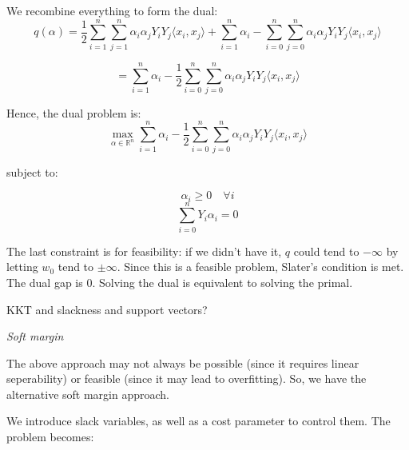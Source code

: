 \documentclass{minimal}
\begin{document}
We recombine everything to form the dual:
$$
q(\alpha) = \frac{1}{2} \sum_{i=1}^n \sum_{j=1}^n \alpha_i \alpha_j Y_i Y_j
\langle x_i, x_j \rangle + \sum_{i=1}^n \alpha_i - 
\sum_{i=0}^n \sum_{j=0}^n \alpha_i \alpha_j Y_i Y_j \langle x_i, x_j \rangle
$$

$$
= \sum_{i=1}^n \alpha_i - \frac{1}{2} \sum_{i=0}^n \sum_{j=0}^n \alpha_i \alpha_j Y_i Y_j \langle x_i, x_j \rangle
$$

Hence, the dual problem is:
$$
\max_{\alpha \in \mathbb{R}^n} 
\sum_{i=1}^n \alpha_i - \frac{1}{2} \sum_{i=0}^n \sum_{j=0}^n \alpha_i \alpha_j Y_i Y_j \langle x_i, x_j \rangle
$$

subject to:

$$
\alpha_i \geq 0 \quad \forall i
$$
$$
\sum_{i=0}^n Y_i \alpha_i = 0
$$

The last constraint is for feasibility: if we didn't have it, $q$ could tend to
$- \infty$ by letting $w_0$ tend to $\pm \infty$. Since this is a feasible
problem, Slater's condition is met. The dual gap is 0. Solving the dual is
equivalent to solving the primal. 

KKT and slackness and support vectors?


\medskip

\textit{Soft margin}

The above approach may not always be possible (since it requires linear
seperability) or feasible (since it may lead to overfitting). So, we have the
alternative soft margin approach.

We introduce slack variables, as well as a cost parameter to control them. The
problem becomes:
\end{document}
